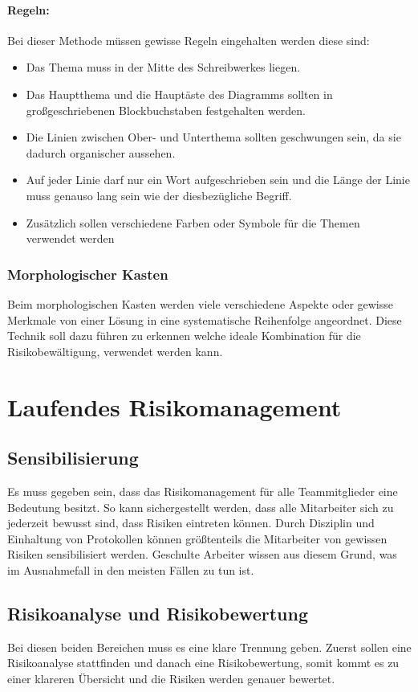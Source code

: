 \paragraph{Regeln:} Bei dieser Methode müssen gewisse Regeln eingehalten werden diese sind:
\begin{itemize}
	\item Das Thema muss in der Mitte des Schreibwerkes liegen.
	\item Das Hauptthema und die Hauptäste des Diagramms sollten in großgeschriebenen Blockbuchstaben festgehalten werden.
	\item Die Linien zwischen Ober- und Unterthema sollten geschwungen sein, da sie dadurch organischer aussehen.
	\item Auf jeder Linie darf nur ein Wort aufgeschrieben sein und die Länge der Linie muss genauso lang sein wie der diesbezügliche Begriff.
	\item Zusätzlich sollen verschiedene Farben oder Symbole für die Themen verwendet werden
\end{itemize}


\subsubsection{Morphologischer Kasten}
Beim morphologischen Kasten werden viele verschiedene Aspekte oder gewisse Merkmale von einer Lösung in eine systematische Reihenfolge angeordnet. Diese Technik soll dazu führen zu erkennen welche ideale Kombination für die Risikobewältigung, verwendet werden kann.

\section{Laufendes Risikomanagement}
\subsection{Sensibilisierung}
Es muss gegeben sein, dass das Risikomanagement für alle Teammitglieder eine Bedeutung besitzt. So kann sichergestellt werden, dass alle Mitarbeiter sich zu jederzeit bewusst sind, dass Risiken eintreten können. Durch Disziplin und Einhaltung von Protokollen können größtenteils die Mitarbeiter von gewissen Risiken sensibilisiert werden. Geschulte Arbeiter wissen aus diesem Grund, was im Ausnahmefall in den meisten Fällen zu tun ist.

\subsection{Risikoanalyse und Risikobewertung}
Bei diesen beiden Bereichen muss es eine klare Trennung geben. Zuerst sollen eine Risikoanalyse stattfinden und danach eine Risikobewertung, somit kommt es zu einer klareren Übersicht und die Risiken werden genauer bewertet.

